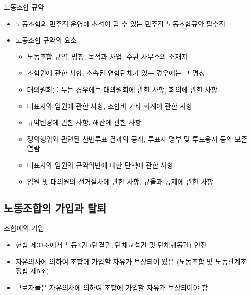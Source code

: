 \documentclass[aspectratio=169,xcolor=dvipsnames,handout]{beamer}
\begin{document}
\begin{frame}{노동조합 규약}
    \begin{itemize}[<+->]
        \item 노동조합의 민주적 운영에 초석이 될 수 있는 민주적 노동조합규약 필수적
        \item 노동조합 규약의 요소
        \begin{itemize}[<+->]
            \item 노동조합 규약, 명칭, 목적과 사업, 주된 사무소의 소재지
            \item 조합원에 관한 사항, 소속된 연합단체가 있는 경우에는 그 명칭
            \item 대의원회를 두는 경우에는 대의원회에 관한 사항, 회의에 관한 사항
            \item 대표자와 임원에 관한 사항, 조합비 기타 회계에 관한 사항
            \item 규약변경에 관한 사항, 해산에 관한 사항
            \item 쟁의행위와 관련된 찬반투표 결과의 공개, 투표자 명부 및 투표용지 등의 보존 열람
            \item 대표자와 임원의 규약위반에 대한 탄핵에 관한 사항
            \item 임원 및 대의원의 선거절차에 관한 사항, 규율과 통제에 관한 사항
        \end{itemize}
    \end{itemize}
\end{frame}


\subsection{노동조합의 가입과 탈퇴}

\begin{frame}{조합에의 가입}
    \begin{itemize}[<+->]
        \item 헌법 제33조에서 노동3권 (단결권, 단체교섭권 및 단체행동권) 인정
        \item 자유의사에 의하여 조합에 가입할 자유가 보장되어 있음 (노동조합 및 노동관계조정법 제5조)
        \item 근로자들은 자유의사에 의하여 조합에 가입할 자유가 보장되어야 함
    \end{itemize}
\end{frame}
\end{document}
